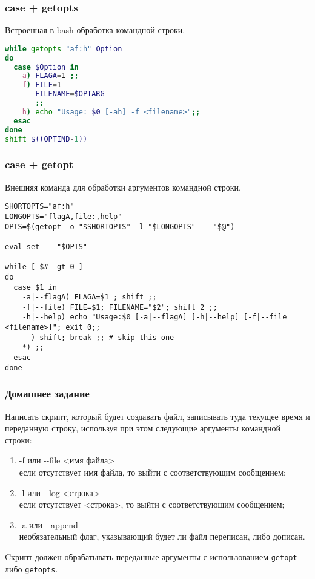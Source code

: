\begin{frame}[fragile]
	\frametitle{case + getopts}
	
	Встроенная в bash обработка командной строки.

\begin{lstlisting}[language=sh,frame=single]
while getopts "af:h" Option
do
  case $Option in 
    a) FLAGA=1 ;;
    f) FILE=1
       FILENAME=$OPTARG
       ;;
    h) echo "Usage: $0 [-ah] -f <filename>";;
  esac  
done
shift $((OPTIND-1))
\end{lstlisting}
\end{frame}

\begin{frame}[fragile]
\frametitle{case + getopt}
	
	Внешняя команда для обработки аргументов командной строки.

	\small
	\begin{lstlisting}
SHORTOPTS="af:h"
LONGOPTS="flagA,file:,help"
OPTS=$(getopt -o "$SHORTOPTS" -l "$LONGOPTS" -- "$@")

eval set -- "$OPTS"

while [ $# -gt 0 ]
do
  case $1 in
    -a|--flagA) FLAGA=$1 ; shift ;;
    -f|--file) FILE=$1; FILENAME="$2"; shift 2 ;;
    -h|--help) echo "Usage:$0 [-a|--flagA] [-h|--help] [-f|--file <filename>]"; exit 0;;
    --) shift; break ;; # skip this one
    *) ;;
  esac
done
	\end{lstlisting}

\end{frame}

\begin{frame}
\frametitle{Домашнее задание}

	Написать скрипт, который будет создавать файл, 
	записывать туда текущее время и переданную строку,
	используя при этом следующие аргументы командной строки: 

	\begin{enumerate}
		\item -f или -{}-file <имя файла>\\
			если отсутствует имя файла, то выйти с соответствующим сообщением;
		\item -l или -{}-log <строка>\\
			если отсутствует <строка>, то выйти с соответствующим сообщением;
		\item -a или -{}-append \\
			необязательный флаг, указывающий будет ли файл переписан, либо дописан.
	\end{enumerate}

	Cкрипт должен обрабатывать переданные аргументы с использованием {\tt getopt} либо {\tt getopts}.

\end{frame}

